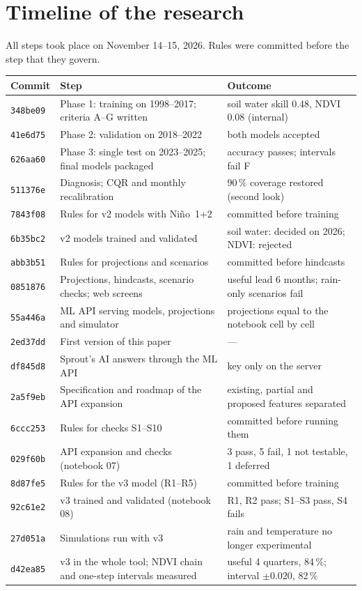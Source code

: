 \documentclass[11pt,a4paper]{article}
\begin{document}
\appendix
\section{Timeline of the research}\label{app:timeline}
All steps took place on November 14--15, 2026. Rules were committed before the step that they govern.

\begin{table}[H]
\centering\small
\begin{tabularx}{\textwidth}{llX}
\toprule
Commit & Step & Outcome \\
\midrule
\texttt{348be09} & Phase 1: training on 1998--2017; criteria A--G written & soil water skill 0.48, NDVI 0.08 (internal) \\
\texttt{41e6d75} & Phase 2: validation on 2018--2022 & both models accepted \\
\texttt{626aa60} & Phase 3: single test on 2023--2025; final models packaged & accuracy passes; intervals fail F \\
\texttt{511376e} & Diagnosis; CQR and monthly recalibration & 90\,\% coverage restored (second look) \\
\texttt{7843f08} & Rules for v2 models with Ni\~no~1+2 & committed before training \\
\texttt{6b35bc2} & v2 models trained and validated & soil water: decided on 2026; NDVI: rejected \\
\texttt{abb3b51} & Rules for projections and scenarios & committed before hindcasts \\
\texttt{0851876} & Projections, hindcasts, scenario checks; web screens & useful lead 6 months; rain-only scenarios fail \\
\texttt{55a446a} & ML API serving models, projections and simulator & projections equal to the notebook cell by cell \\
\texttt{2ed37dd} & First version of this paper & --- \\
\texttt{df845d8} & Sprout's AI answers through the ML API & key only on the server \\
\texttt{2a5f9eb} & Specification and roadmap of the API expansion & existing, partial and proposed features separated \\
\texttt{6ccc253} & Rules for checks S1--S10 & committed before running them \\
\texttt{029f60b} & API expansion and checks (notebook 07) & 3 pass, 5 fail, 1 not testable, 1 deferred \\
\texttt{8d87fe5} & Rules for the v3 model (R1--R5) & committed before training \\
\texttt{92c61e2} & v3 trained and validated (notebook 08) & R1, R2 pass; S1--S3 pass, S4 fails \\
\texttt{27d051a} & Simulations run with v3 & rain and temperature no longer experimental \\
\texttt{d42ea85} & v3 in the whole tool; NDVI chain and one-step intervals measured & useful 4 quarters, 84\,\%; interval $\pm0.020$, 82\,\% \\
\bottomrule
\end{tabularx}
\end{table}
\end{document}
